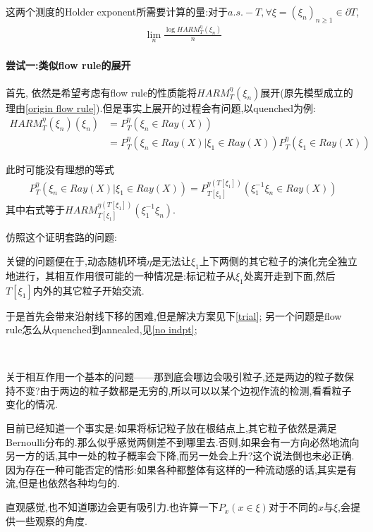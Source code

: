			这两个测度的Holder exponent所需要计算的量:对于$a.s. - T, \forall \xi = (\xi_n)_{n \ge 1} \in \partial T$,
			\begin{align}
				\lim\limits_{n}\frac{\log HARM^{\eta}_T(\xi_n)}{n}
				\label{holderexponent}
			\end{align}


			\paragraph*{尝试一:类似flow rule的展开}
			\quad %

				首先, 依然是希望考虑有flow rule的性质能将$HARM^{\eta}_T(\xi_n)$展开(原先模型成立的理由\ref{origin flow rule}).但是事实上展开的过程会有问题,以quenched为例:
				\begin{align*}
					HARM^{\eta}_T(\xi_n)(\xi_n) &= P^{\eta}_T( \xi_n \in Ray(X) ) \\
					&= P^{\eta}_T( \xi_n \in Ray(X) | \xi_1 \in Ray(X))  P^{\eta}_T( \xi_1 \in Ray(X) )
				\end{align*}
				
				此时可能没有理想的等式
				\begin{align}
					P^{\eta}_T( \xi_n \in Ray(X) | \xi_1 \in Ray(X)) 
					= P^{\eta(T[\xi_1])}_{T[\xi_1]}( \xi_1^{-1}\xi_n \in Ray(X) )
					\label{shiftdown}
				\end{align}
				其中右式等于$HARM^{\eta(T[\xi_1])}_{T[\xi_1]}(\xi_1^{-1}\xi_n)$.

				仿照这个证明套路的问题:

				关键的问题便在于,动态随机环境$\eta$是无法让$\xi_1$上下两侧的其它粒子的演化完全独立地进行，其相互作用很可能的一种情况是:标记粒子从$\xi_1$处离开走到下面,然后$T[\xi_1]$内外的其它粒子开始交流.

				于是首先会带来沿射线下移的困难,但是解决方案见下\ref{trial};
				另一个问题是flow rule怎么从quenched到annealed,见\ref{no indpt};

				\begin{que}
					\label{flow}
					\ 

					关于相互作用一个基本的问题——那到底会哪边会吸引粒子,还是两边的粒子数保持不变?由于两边的粒子数都是无穷的,所以可以以某个边视作流的检测,看看粒子变化的情况.

					目前已经知道一个事实是:如果将标记粒子放在根结点上,其它粒子依然是满足Bernoulli分布的.那么似乎感觉两侧差不到哪里去.否则,如果会有一方向必然地流向另一方的话,其中一处的粒子概率会下降,而另一处会上升?这个说法倒也未必正确.因为存在一种可能否定的情形:如果各种都整体有这样的一种流动感的话,其实是有流,但是也依然各种均匀的.

					直观感觉,也不知道哪边会更有吸引力.也许算一下$P_x(x\in \xi)$对于不同的$x$与$\xi$,会提供一些观察的角度.

				\end{que}




